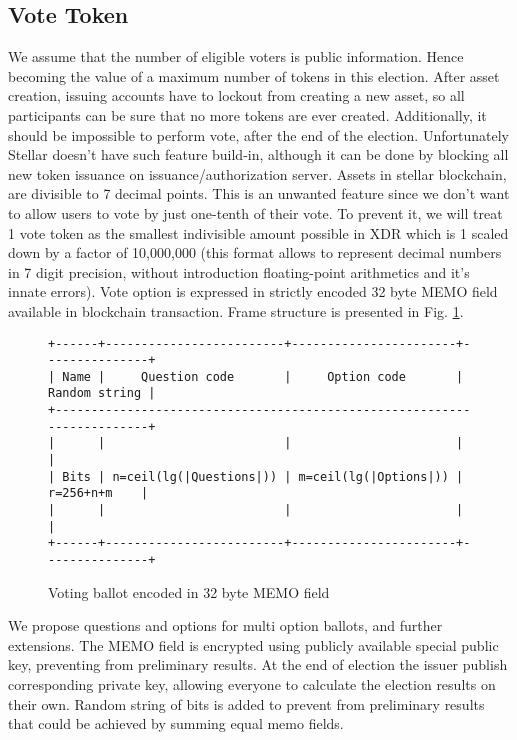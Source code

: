 \documentclass[runningheads]{llncs}
\begin{document}
\subsection{Vote Token}
We assume that the number of eligible voters is public information. Hence becoming the value of a maximum number of tokens in this election. After asset creation, issuing accounts have to lockout from creating a new asset, so all participants can be sure that no more tokens are ever created. Additionally, it should be impossible to perform vote, after the end of the election. Unfortunately Stellar doesn’t have such feature build-in, although it can be done by blocking all new token issuance on issuance/authorization server.
Assets in stellar blockchain, are divisible to 7 decimal points. This is an unwanted feature since we don’t want to allow users to vote by just one-tenth of their vote. To prevent it, we will treat 1 vote token as the smallest indivisible amount possible in XDR which is 1 scaled down by a factor of 10,000,000 (this format allows to represent decimal numbers in 7 digit precision, without introduction floating-point arithmetics and it’s innate errors).
Vote option is expressed in strictly encoded 32 byte MEMO field available in blockchain transaction. Frame structure is presented in Fig. \ref{fig:ballot-encoding}. 
\begin{figure}
\begin{verbatim}
+------+-------------------------+-----------------------+---------------+
| Name |     Question code       |     Option code       | Random string |
+------------------------------------------------------------------------+
|      |                         |                       |               |
| Bits | n=ceil(lg(|Questions|)) | m=ceil(lg(|Options|)) |  r=256+n+m    |
|      |                         |                       |               |
+------+-------------------------+-----------------------+---------------+

\end{verbatim}
\caption{Voting ballot encoded in 32 byte MEMO field}
\label{fig:ballot-encoding}
\end{figure} 

We propose questions and options for multi option ballots, and further extensions.
The MEMO field is encrypted using publicly available special public key, preventing from preliminary results. At the end of election the issuer publish corresponding private key, allowing everyone to calculate the election results on their own. Random string of bits is added to prevent from preliminary results that could be achieved by summing equal memo fields.
\end{document}
